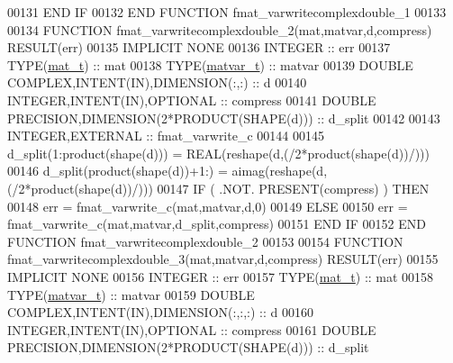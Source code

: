 \begin{DoxyCode}
00131 \textcolor{keywordflow}{    END IF}
00132 \textcolor{keyword}{END FUNCTION }fmat\_varwritecomplexdouble\_1
00133 
00134 \textcolor{keyword}{FUNCTION }fmat\_varwritecomplexdouble\_2(mat,matvar,d,compress) \textcolor{keyword}{RESULT}(err)
00135 \textcolor{keywordtype}{IMPLICIT NONE}
00136     \textcolor{keywordtype}{INTEGER}                                  :: err
00137     \textcolor{keywordtype}{TYPE}(\hyperlink{group___m_a_t_gab0fc888f5a5d79943b16284b1f91c2e8}{mat\_t})                              :: mat
00138     \textcolor{keywordtype}{TYPE}(\hyperlink{group___m_a_t_structmatvar__t}{matvar\_t})                           :: matvar
00139     \textcolor{keywordtype}{DOUBLE COMPLEX},\textcolor{keywordtype}{INTENT(IN)},\textcolor{keywordtype}{DIMENSION(:,:)} :: d
00140     \textcolor{keywordtype}{INTEGER},\textcolor{keywordtype}{INTENT(IN)},\textcolor{keywordtype}{OPTIONAL}              :: compress
00141     \textcolor{keywordtype}{DOUBLE PRECISION},\textcolor{keywordtype}{DIMENSION(2*PRODUCT(SHAPE(d)))} :: d\_split
00142 
00143     \textcolor{keywordtype}{INTEGER},\textcolor{keywordtype}{EXTERNAL}                         :: fmat\_varwrite\_c
00144 
00145     d\_split(1:product(shape(d)))  = \textcolor{keywordtype}{REAL}(reshape(d,(/2*product(shape(d))/)))
00146     d\_split(product(shape(d))+1:) = aimag(reshape(d,(/2*product(shape(d))/)))
00147     \textcolor{keywordflow}{IF} ( .NOT. \textcolor{keyword}{PRESENT}(compress) ) \textcolor{keywordflow}{THEN}
00148         err = fmat\_varwrite\_c(mat,matvar,d,0)
00149     \textcolor{keywordflow}{ELSE}
00150         err = fmat\_varwrite\_c(mat,matvar,d\_split,compress)
00151 \textcolor{keywordflow}{    END IF}
00152 \textcolor{keyword}{END FUNCTION }fmat\_varwritecomplexdouble\_2
00153 
00154 \textcolor{keyword}{FUNCTION }fmat\_varwritecomplexdouble\_3(mat,matvar,d,compress) \textcolor{keyword}{RESULT}(err)
00155 \textcolor{keywordtype}{IMPLICIT NONE}
00156     \textcolor{keywordtype}{INTEGER}                                    :: err
00157     \textcolor{keywordtype}{TYPE}(\hyperlink{group___m_a_t_gab0fc888f5a5d79943b16284b1f91c2e8}{mat\_t})                                :: mat
00158     \textcolor{keywordtype}{TYPE}(\hyperlink{group___m_a_t_structmatvar__t}{matvar\_t})                             :: matvar
00159     \textcolor{keywordtype}{DOUBLE COMPLEX},\textcolor{keywordtype}{INTENT(IN)},\textcolor{keywordtype}{DIMENSION(:,:,:)} :: d
00160     \textcolor{keywordtype}{INTEGER},\textcolor{keywordtype}{INTENT(IN)},\textcolor{keywordtype}{OPTIONAL}                :: compress
00161     \textcolor{keywordtype}{DOUBLE PRECISION},\textcolor{keywordtype}{DIMENSION(2*PRODUCT(SHAPE(d)))} :: d\_split

\end{DoxyCode}
